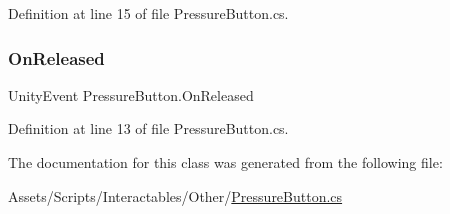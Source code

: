 Definition at line 15 of file Pressure\+Button.\+cs.

\mbox{\label{class_pressure_button_af4513018957a5721b4ecdd58f5c9f8ff}} 
\subsubsection{\texorpdfstring{On\+Released}{OnReleased}}
{\footnotesize\ttfamily Unity\+Event Pressure\+Button.\+On\+Released}



Definition at line 13 of file Pressure\+Button.\+cs.



The documentation for this class was generated from the following file\+:\begin{DoxyCompactItemize}
\item 
Assets/\+Scripts/\+Interactables/\+Other/\mbox{\hyperlink{_pressure_button_8cs}{Pressure\+Button.\+cs}}\end{DoxyCompactItemize}
